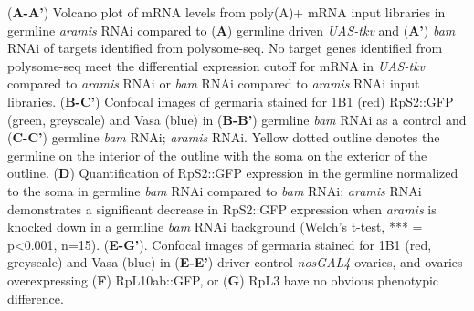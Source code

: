 \documentclass[12pt,oneside]{reedthesis}
\begin{document}
\textbf{\hfill\break
}

(\textbf{A-A'}) Volcano plot of mRNA levels from poly(A)+ mRNA input libraries in
germline \emph{aramis} RNAi compared to (\textbf{A}) germline driven \emph{UAS-tkv}
and (\textbf{A'}) \emph{bam} RNAi of targets identified from polysome-seq. No
target genes identified from polysome-seq meet the differential
expression cutoff for mRNA in \emph{UAS-tkv} compared to \emph{aramis} RNAi or
\emph{bam} RNAi compared to \emph{aramis} RNAi input libraries. (\textbf{B-C'})
Confocal images of germaria stained for 1B1 (red) RpS2::GFP (green,
greyscale) and Vasa (blue) in (\textbf{B-B'}) germline \emph{bam} RNAi as a
control and (\textbf{C-C'}) germline \emph{bam} RNAi; \emph{aramis} RNAi. Yellow dotted
outline denotes the germline on the interior of the outline with the
soma on the exterior of the outline. (\textbf{D}) Quantification of RpS2::GFP
expression in the germline normalized to the soma in germline \emph{bam} RNAi
compared to \emph{bam} RNAi; \emph{aramis} RNAi demonstrates a significant
decrease in RpS2::GFP expression when \emph{aramis} is knocked down in a
germline \emph{bam} RNAi background (Welch's t-test, *** = p\textless0.001,
n=15). (\textbf{E-G'}). Confocal images of germaria stained for 1B1 (red,
greyscale) and Vasa (blue) in (\textbf{E-E'}) driver control \emph{nosGAL4}
ovaries, and ovaries overexpressing (\textbf{F}) RpL10ab::GFP, or (\textbf{G})
RpL3 have no obvious phenotypic difference.

\textbf{\hfill\break
}
\end{document}
